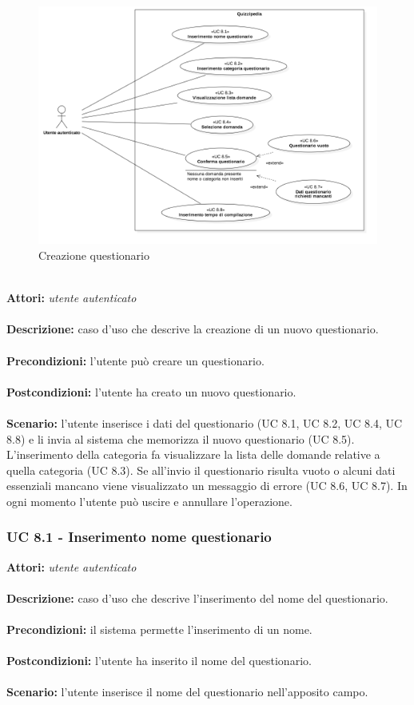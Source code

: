 \documentclass[a4paper,11pt]{article}
\begin{document}
\begin{figure}[h!]
\centering
\includegraphics[scale=0.45]{../immagini/UC8.png}
\caption{Creazione questionario}
\end{figure}
\ \\
\textbf{Attori:} \textit{utente autenticato}
\\ \\
\textbf{Descrizione:} caso d'uso che descrive la creazione di un nuovo questionario.\\
\\
\textbf{Precondizioni:} l'utente può creare un questionario.\\
\\
\textbf{Postcondizioni:} l’utente ha creato un nuovo questionario.\\
\\
\textbf{Scenario:} l’utente inserisce i dati del questionario (UC 8.1, UC 8.2, UC 8.4, UC 8.8) e li invia al sistema che memorizza il nuovo questionario (UC 8.5). L'inserimento della categoria fa visualizzare la lista delle domande relative a quella categoria (UC 8.3). Se all'invio il questionario risulta vuoto o alcuni dati essenziali mancano viene visualizzato un messaggio di errore (UC 8.6, UC 8.7). In ogni momento l'utente può uscire e annullare l'operazione.\\


\subsubsection{UC 8.1 - Inserimento nome questionario}

\textbf{Attori:} \textit{utente autenticato}
\\ \\
\textbf{Descrizione:} caso d'uso che descrive l'inserimento del nome del questionario.\\
\\
\textbf{Precondizioni:} il sistema permette l'inserimento di un nome.\\
\\
\textbf{Postcondizioni:} l’utente ha inserito il nome del questionario.\\
\\
\textbf{Scenario:} l’utente inserisce il nome del questionario nell'apposito campo.\\
\end{document}
